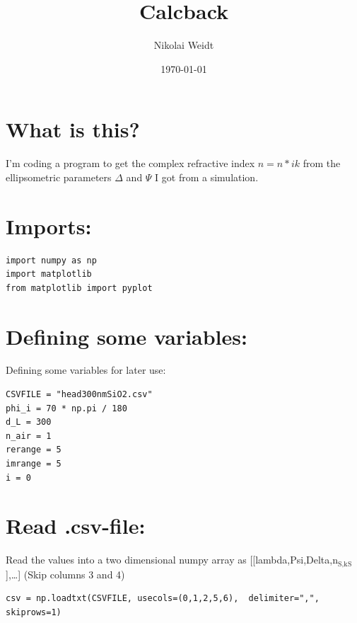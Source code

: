 \documentclass[11pt]{article}
\author{Nikolai Weidt}
\date{\today}
\title{Calcback}
\begin{document}
\maketitle
\tableofcontents


\section{What is this?}
\label{sec:org1000554}
I'm coding a program to get the complex refractive index \(n = n * ik\) from the ellipsometric parameters \(\Delta\) and \(\Psi\) I got from a simulation.
\section{Imports:}
\label{sec:org17d5ecd}
\begin{verbatim}
import numpy as np
import matplotlib
from matplotlib import pyplot
\end{verbatim}

\section{Defining some variables:}
\label{sec:org00ef83b}
Defining some variables for later use:

\begin{verbatim}
CSVFILE = "head300nmSiO2.csv"
phi_i = 70 * np.pi / 180
d_L = 300
n_air = 1
rerange = 5
imrange = 5
i = 0
\end{verbatim}

\section{Read .csv-file:}
\label{sec:org26419b9}
Read the values into a two dimensional numpy array as [[lambda,Psi,Delta,n\(_{\text{S,k}}\)\(_{\text{S}}\)],\ldots{}] (Skip columns 3 and 4)

\begin{verbatim}
csv = np.loadtxt(CSVFILE, usecols=(0,1,2,5,6),  delimiter=",", skiprows=1)
\end{verbatim}
\end{document}
